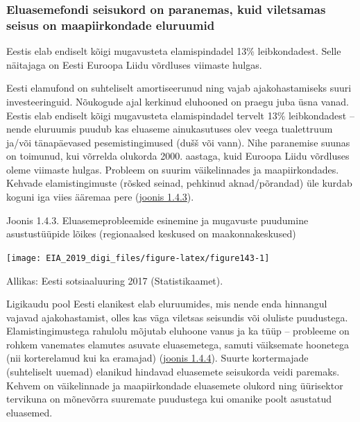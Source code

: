 \documentclass[estonian,]{article}
\begin{document}
\hypertarget{eluasemefondi-seisukord-on-paranemas-kuid-viletsamas-seisus-on-maapiirkondade-eluruumid}{%
\subsubsection*{Eluasemefondi seisukord on paranemas, kuid viletsamas seisus on maapiirkondade eluruumid}\label{eluasemefondi-seisukord-on-paranemas-kuid-viletsamas-seisus-on-maapiirkondade-eluruumid}}

\begin{blockquote-right}
Eestis elab endiselt kõigi mugavusteta elamispindadel 13\%
leibkondadest. Selle näitajaga on Eesti Euroopa Liidu võrdluses viimaste
hulgas.
\end{blockquote-right}

Eesti elamufond on suhteliselt amortiseerunud ning vajab ajakohastamiseks suuri investeeringuid. Nõukogude ajal kerkinud eluhooned on praegu juba üsna vanad. Eestis elab endiselt kõigi mugavusteta elamispindadel tervelt 13\% leibkondadest -- nende eluruumis puudub kas eluaseme ainukasutuses olev veega tualettruum ja/või tänapäevased pesemistingimused (dušš või vann). Nihe paranemise suunas on toimunud, kui võrrelda olukorda 2000. aastaga, kuid Euroopa Liidu võrdluses oleme viimaste hulgas. Probleem on suurim väikelinnades ja maapiirkondades. Kehvade elamistingimuste (rõsked seinad, pehkinud aknad/põrandad) üle kurdab koguni iga viies ääremaa pere (\href{figure124}{joonis 1.4.3}).

{Joonis 1.4.3.} Eluasemeprobleemide esinemine ja mugavuste puudumine asustustüüpide lõikes (regionaalsed keskused on maakonnakeskused)

\begin{center}\texttt{[image: EIA\_2019\_digi\_files/figure-latex/figure143-1]} \end{center}

\begin{imgsource}
{Allikas:} Eesti sotsiaaluuring 2017 (Statistikaamet).
\end{imgsource}

Ligikaudu pool Eesti elanikest elab eluruumides, mis nende enda hinnangul vajavad ajakohastamist, olles kas väga viletsas seisundis või oluliste puudustega. Elamistingimustega rahulolu mõjutab eluhoone vanus ja ka tüüp -- probleeme on rohkem vanemates elamutes asuvate eluasemetega, samuti väiksemate hoonetega (nii korterelamud kui ka eramajad) (\protect\hyperlink{figure144}{joonis 1.4.4}). Suurte kortermajade (suhteliselt uuemad) elanikud hindavad eluasemete seisukorda veidi paremaks. Kehvem on väikelinnade ja maapiirkondade eluasemete olukord ning üürisektor tervikuna on mõnevõrra suuremate puudustega kui omanike poolt asustatud eluasemed.
\end{document}
